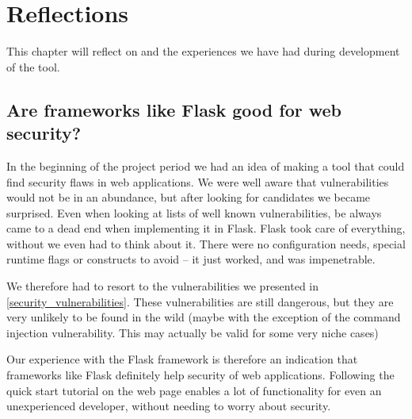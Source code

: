 \section{Reflections}
This chapter will reflect on \pyt{} and the experiences we have had during development of the tool.

\subsection{Are frameworks like Flask good for web security?}
In the beginning of the project period we had an idea of making a tool that could find security flaws in web applications.
We were well aware that vulnerabilities would not be in an abundance, but after looking for candidates we became surprised.
Even when looking at lists of well known vulnerabilities, be always came to a dead end when implementing it in Flask.
Flask took care of everything, without we even had to think about it.
There were no configuration needs, special runtime flags or constructs to avoid -- it just worked, and was impenetrable.

We therefore had to resort to the vulnerabilities we presented in \cref{security_vulnerabilities}.
These vulnerabilities are still dangerous, but they are very unlikely to be found in the wild (maybe with the exception of the command injection vulnerability. This may actually be valid for some very niche cases)

Our experience with the Flask framework is therefore an indication that frameworks like Flask definitely help security of web applications.
Following the quick start tutorial on the web page enables a lot of functionality for even an unexperienced developer, without needing to worry about security.
